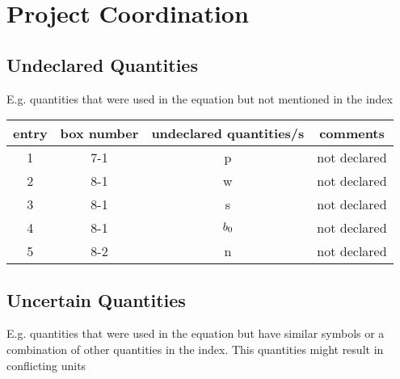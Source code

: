 \section{Project Coordination}

\subsection{Undeclared Quantities}

E.g. quantities that were used in the equation but not mentioned in the index \\

\begin{tabular} { | c | c | c | c | } 
 \hline
    entry & box number
    & undeclared quantities/s 
    & comments \\
 \hline 
  	 1 & 7-1 & p &  not declared \\ \hline
     2 & 8-1 & w &  not declared \\ \hline
     3 & 8-1 & s &  not declared \\ \hline
     4 & 8-1 & $b_{\init}$ &  not declared \\ \hline
 	 5 & 8-2 & n &  not declared \\ \hline
 
\end{tabular}

\subsection{Uncertain Quantities}

E.g. quantities that were used in the equation but have similar symbols or a combination of other quantities in the index. This quantities might result in conflicting units \\

